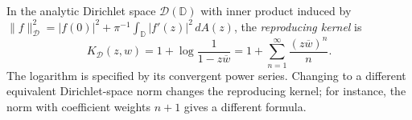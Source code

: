 
In the analytic Dirichlet space $\mathcal D(\mathbb D)$ with inner product induced by $\|f\|_{\mathcal D}^2=|f(0)|^2+\pi^{-1}\int_{\mathbb D}|f'(z)|^2\,dA(z)$, the \emph{reproducing kernel} is
\[
K_{\mathcal D}(z,w)=1+\log\frac1{1-z\overline w}
=1+\sum_{n=1}^\infty\frac{(z\overline w)^n}{n}.
\]
The logarithm is specified by its convergent power series. Changing to a different equivalent Dirichlet-space norm changes the reproducing kernel; for instance, the norm with coefficient weights $n+1$ gives a different formula.
